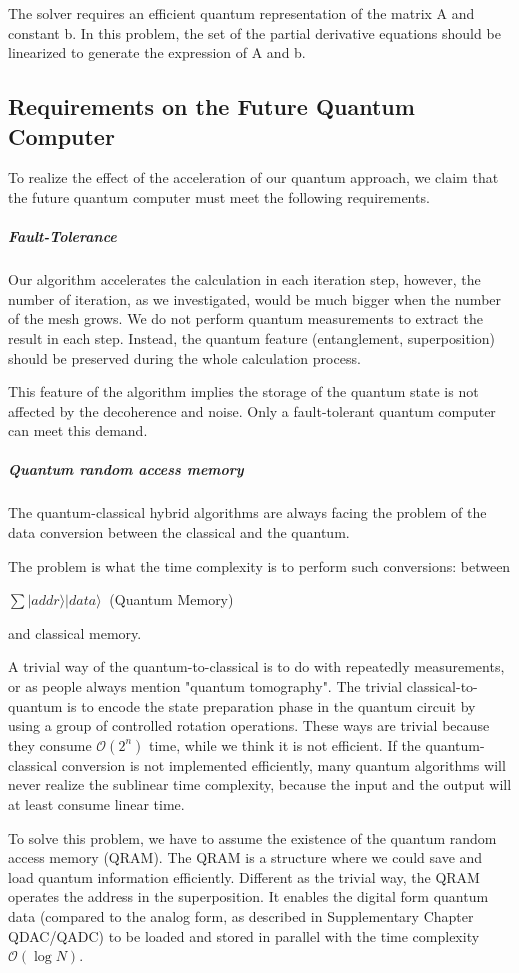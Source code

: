 \documentclass[%
 reprint,
 amsmath,amssymb,
pra,
]{revtex4-1}
\begin{document}
The solver requires an efficient quantum representation of the matrix A and constant b. In this problem, the set of the partial derivative equations should be linearized to generate the expression of A and b.

\subsection{Requirements on the Future Quantum Computer}

To realize the effect of the acceleration of our quantum approach, we claim that the future quantum computer must meet the following requirements.

\subparagraph{Fault-Tolerance} Our algorithm accelerates the calculation in each iteration step, however, the number of iteration, as we investigated, would be much bigger when the number of the mesh grows. We do not perform quantum measurements to extract the result in each step. Instead, the quantum feature (entanglement, superposition) should be preserved during the whole calculation process. 

This feature of the algorithm implies the storage of the quantum state is not affected by the decoherence and noise. Only a fault-tolerant quantum computer can meet this demand.

\subparagraph{Quantum random access memory} The quantum-classical hybrid algorithms are always facing the problem of the data conversion between the classical and the quantum.

The problem is what the time complexity is to perform such conversions: between
\begin{center}
$ \sum|addr\rangle|data\rangle\ $ (Quantum Memory) 
\end{center}
and classical memory.

A trivial way of the quantum-to-classical is to do with repeatedly measurements, or as people always mention "quantum tomography". The trivial classical-to-quantum is to encode the state preparation phase in the quantum circuit by using a group of controlled rotation operations. These ways are trivial because they consume $\mathcal{O}(2^n)$ time, while we think it is not efficient. If the quantum-classical conversion is not implemented efficiently, many quantum algorithms will never realize the sublinear time complexity, because the input and the output will at least consume linear time.

To solve this problem, we have to assume the existence of the quantum random access memory (QRAM). The QRAM is a structure where we could save and load quantum information efficiently. Different as the trivial way, the QRAM operates the address in the superposition. It enables the digital form quantum data (compared to the analog form, as described in Supplementary Chapter QDAC/QADC\cite{mitarai2019quantum, martin2019digital}) to be loaded and stored in parallel with the time complexity $\mathcal{O}(\log N)$.
\end{document}
